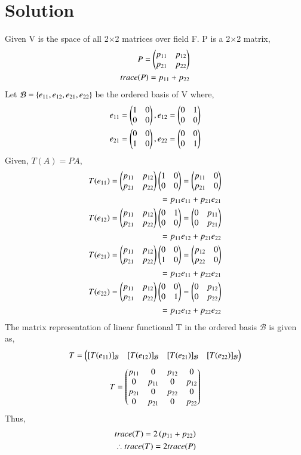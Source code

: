 \documentclass[journal,12pt,twocolumn]{IEEEtran}
\begin{document}
\section{Solution}
Given V is the space of all 2$\times$2 matrices over field F. P is a 2$\times$2 matrix, 
\begin{align}
    P = \begin{pmatrix}p_{11}&p_{12}\\ p_{21}&p_{22}\end{pmatrix} \\
    trace(P) = p_{11} + p_{22}
\end{align}
Let $\mathcal{B}=\left\{e_{11}, e_{12}, e_{21}, e_{22}\right\}$ be the ordered basis of V where, 
\begin{align}
    e_{11}=\begin{pmatrix}1&0\\0&0\end{pmatrix}, e_{12}=\begin{pmatrix}0&1\\0&0\end{pmatrix}\\
    e_{21}=\begin{pmatrix}0&0\\1&0\end{pmatrix}, e_{22}=\begin{pmatrix}0&0\\0&1\end{pmatrix}
\end{align}
Given, $T(A)=PA$, 
\begin{align}
    T(e_{11}) = \begin{pmatrix}p_{11}&p_{12}\\ p_{21}&p_{22}\end{pmatrix}\begin{pmatrix}1&0\\0&0\end{pmatrix}
    = \begin{pmatrix}p_{11}&0\\p_{21}&0\end{pmatrix} \\
    = p_{11}e_{11} + p_{21}e_{21} \\
    T(e_{12}) = \begin{pmatrix}p_{11}&p_{12}\\ p_{21}&p_{22}\end{pmatrix}\begin{pmatrix}0&1\\0&0\end{pmatrix} = \begin{pmatrix}0&p_{11}\\0&p_{21}\end{pmatrix}\\
    = p_{11}e_{12} + p_{21}e_{22} \\
    T(e_{21}) = \begin{pmatrix}p_{11}&p_{12}\\ p_{21}&p_{22}\end{pmatrix}\begin{pmatrix}0&0\\1&0\end{pmatrix} = 
    \begin{pmatrix}p_{12}&0\\p_{22}&0\end{pmatrix}\\
    = p_{12}e_{11} + p_{22}e_{21} \\
    T(e_{22}) = \begin{pmatrix}p_{11}&p_{12}\\ p_{21}&p_{22}\end{pmatrix}\begin{pmatrix}0&0\\0&1\end{pmatrix} = 
    \begin{pmatrix}0&p_{12}\\0&p_{22}\end{pmatrix} \\
    = p_{12}e_{12} + p_{22}e_{22}
\end{align}
The matrix representation of linear functional T in the ordered basis $\mathcal{B}$ is given as,
\begin{align}
    T = \begin{pmatrix}[T(e_{11})]_{\mathcal{B}} & [T(e_{12})]_{\mathcal{B}} & [T(e_{21})]_{\mathcal{B}} & [T(e_{22})]_{\mathcal{B}}\end{pmatrix}
\end{align}
\begin{align}
    T = \begin{pmatrix}p_{11}&0&p_{12}&0\\0&p_{11}&0&p_{12}\\p_{21}&0&p_{22}&0\\0&p_{21}&0&p_{22}\end{pmatrix}
\end{align}
Thus, 
\begin{align}
    trace(T) = 2\left(p_{11}+p_{22}\right)\\
    \therefore trace(T)= 2trace(P)
\end{align}
\end{document}
